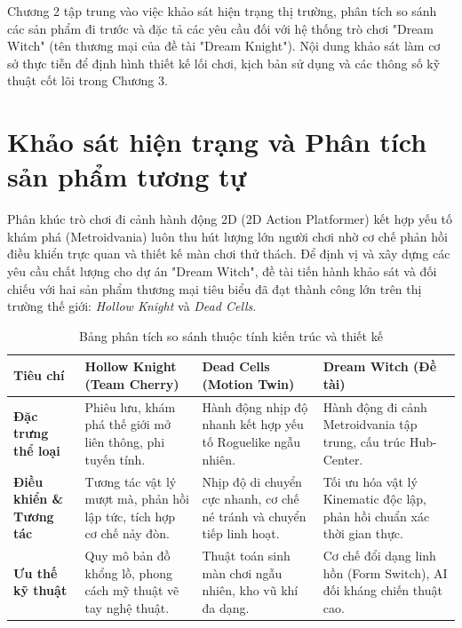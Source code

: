 \documentclass[../DoAn.tex]{subfiles}
\begin{document}
Chương 2 tập trung vào việc khảo sát hiện trạng thị trường, phân tích so sánh các sản phẩm đi trước và đặc tả các yêu cầu đối với hệ thống trò chơi "Dream Witch" (tên thương mại của đề tài "Dream Knight"). Nội dung khảo sát làm cơ sở thực tiễn để định hình thiết kế lối chơi, kịch bản sử dụng và các thông số kỹ thuật cốt lõi trong Chương 3.

\section{Khảo sát hiện trạng và Phân tích sản phẩm tương tự}
\label{section:2.1}

Phân khúc trò chơi đi cảnh hành động 2D (2D Action Platformer) kết hợp yếu tố khám phá (Metroidvania) luôn thu hút lượng lớn người chơi nhờ cơ chế phản hồi điều khiển trực quan và thiết kế màn chơi thử thách. Để định vị và xây dựng các yêu cầu chất lượng cho dự án "Dream Witch", đề tài tiến hành khảo sát và đối chiếu với hai sản phẩm thương mại tiêu biểu đã đạt thành công lớn trên thị trường thế giới: \textit{Hollow Knight} và \textit{Dead Cells}.

\begin{table}[H]
\centering
\caption{Bảng phân tích so sánh thuộc tính kiến trúc và thiết kế}
\label{tab:so_sanh_game}
\begin{tabularx}{\textwidth}{|L|L|L|L|}
\hline
\textbf{Tiêu chí} & \textbf{Hollow Knight} (Team Cherry) & \textbf{Dead Cells} (Motion Twin) & \textbf{Dream Witch} (Đề tài) \\ \hline
\textbf{Đặc trưng thể loại} & Phiêu lưu, khám phá thế giới mở liên thông, phi tuyến tính. & Hành động nhịp độ nhanh kết hợp yếu tố Roguelike ngẫu nhiên. & Hành động đi cảnh Metroidvania tập trung, cấu trúc Hub-Center. \\ \hline
\textbf{Điều khiển \& Tương tác} & Tương tác vật lý mượt mà, phản hồi lập tức, tích hợp cơ chế nảy đòn. & Nhịp độ di chuyển cực nhanh, cơ chế né tránh và chuyển tiếp linh hoạt. & Tối ưu hóa vật lý Kinematic độc lập, phản hồi chuẩn xác thời gian thực. \\ \hline
\textbf{Ưu thế kỹ thuật} & Quy mô bản đồ khổng lồ, phong cách mỹ thuật vẽ tay nghệ thuật. & Thuật toán sinh màn chơi ngẫu nhiên, kho vũ khí đa dạng. & Cơ chế đổi dạng linh hồn (Form Switch), AI đối kháng chiến thuật cao. \\ \hline
\end{tabularx}
\end{table}
\end{document}
